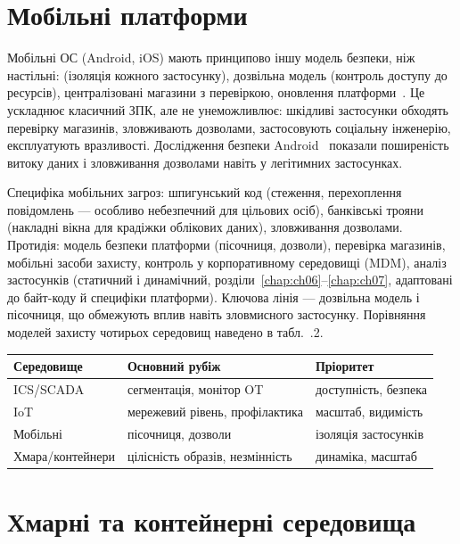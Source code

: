 \section{Мобільні платформи}\label{sec:ch14-mobile}

Мобільні ОС (Android, iOS) мають принципово іншу модель безпеки, ніж настільні:  (ізоляція кожного застосунку), дозвільна модель (контроль доступу до ресурсів), централізовані магазини з перевіркою, оновлення платформи~\cite{ch14:android}. Це ускладнює класичний ЗПК, але не унеможливлює: шкідливі застосунки обходять перевірку магазинів, зловживають дозволами, застосовують соціальну інженерію, експлуатують вразливості. Дослідження безпеки Android~\cite{ch14:enck} показали поширеність витоку даних і зловживання дозволами навіть у легітимних застосунках.

Специфіка мобільних загроз: шпигунський код (стеження, перехоплення повідомлень --- особливо небезпечний для цільових осіб), банківські трояни (накладні вікна для крадіжки облікових даних), зловживання дозволами. Протидія: модель безпеки платформи (пісочниця, дозволи), перевірка магазинів, мобільні засоби захисту, контроль у корпоративному середовищі (MDM), аналіз застосунків (статичний і динамічний, розділи~\ref{chap:ch06}--\ref{chap:ch07}, адаптовані до байт-коду й специфіки платформи). Ключова лінія --- дозвільна модель і пісочниця, що обмежують вплив навіть зловмисного застосунку. Порівняння моделей захисту чотирьох середовищ наведено в табл.~\thechapter.2.


\begin{center}\footnotesize
\begin{tabularx}{\linewidth}{L{16mm} Y L{20mm}}
\toprule
Середовище & Основний рубіж & Пріоритет \\
\midrule
ICS/SCADA & сегментація, монітор OT & доступність, безпека \\
IoT & мережевий рівень, профілактика & масштаб, видимість \\
Мобільні & пісочниця, дозволи & ізоляція застосунків \\
Хмара/контейнери & цілісність образів, незмінність & динаміка, масштаб \\
\bottomrule
\end{tabularx}
\end{center}

\section{Хмарні та контейнерні середовища}\label{sec:ch14-cloud}

